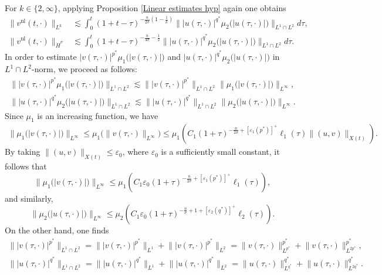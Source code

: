 \documentclass[11pt,reqno]{amsart}
\newcommand{\tron}[1]{\left( #1 \right)}
\numberwithin{equation}{section}
\begin{document}
For $k\in\{2,\infty\}$, applying Proposition \ref{Linear estimates hyp} again one obtains
\begin{align}
\big\|v^{\mathrm{nl}}(t,\cdot)\big\|_{L^k} &\lesssim \int_0^t(1+t-\tau)^{-\frac{n}{2\sigma}\tron{1-\frac{1}{k}}}\big\||u(\tau, \cdot)|^{q^*} \mu_2\big(|u(\tau, \cdot)|\big)\big\|_{L^1\cap L^2} d \tau,\label{eq4thr1.1}\\ 
\big\|v^{\mathrm{nl}}(t,\cdot)\big\|_{\dot{H}^{\sigma}} &\lesssim \int_0^t(1+t-\tau)^{-\frac{n}{4\sigma}-\frac{1}{2}}\big\||u(\tau, \cdot)|^{q^*} \mu_2\big(|u(\tau, \cdot)|\big)\big\|_{L^1\cap L^2} d \tau.\label{eq5thr1.1}
\end{align}
In order to estimate $|v(\tau, \cdot)|^{p^*} \mu_1\big(|v(\tau, \cdot)|\big)$ and $|u(\tau, \cdot)|^{q^*} \mu_2\big(|u(\tau, \cdot)|\big)$ in $L^1 \cap L^2$-norm, we proceed as follows:
\begin{align*}
\big\||v(\tau, \cdot)|^{p^*} \mu_1\big(|v(\tau, \cdot)|\big)\big\|_{L^1\cap L^2} \lesssim \big\||v(\tau, \cdot)|^{p^*}\big\|_{L^1\cap L^2}\big\|\mu_1\big(|v(\tau, \cdot)|\big)\big\|_{L^{\infty}},\\
\big\||u(\tau, \cdot)|^{q^*} \mu_2\big(|u(\tau, \cdot)|\big)\big\|_{L^1\cap L^2} \lesssim\big\||u(\tau, \cdot)|^{q^*}\big\|_{L^1\cap L^2}\big\|\mu_2\big(|u(\tau, \cdot)|\big)\big\|_{L^{\infty}}.
\end{align*}
Since $\mu_1$ is an increasing function, we have
$$
\begin{aligned}
\big\|\mu_1\big(|v(\tau, \cdot)|\big)\big\|_{L^{\infty}} \leq \mu_1\big(\|v(\tau, \cdot)\|_{L^{\infty}}\big) \leq \mu_1\left(C_1(1+\tau)^{-\frac{n}{2\sigma}+[\varepsilon_1(p^*)]^{+}}\ell_1(\tau)\|(u,v)\|_{X(t)}\right).
\end{aligned}
$$
By taking $\|(u,v)\|_{X(t)} \leq \varepsilon_0$, where $\varepsilon_0$ is a sufficiently small constant, it follows that
$$
\big\|\mu_1\big(|v(\tau, \cdot)|\big)\big\|_{L^{\infty}} \leq \mu_1\left(C_1 \varepsilon_0(1+\tau)^{-\frac{n}{2\sigma}+[\varepsilon_1(p^*)]^{+}}\ell_1(\tau)\right),
$$
and similarly,
\[
\big\|\mu_2\big(|u(\tau, \cdot)|\big)\big\|_{L^{\infty}} \leq\mu_2\left(C_1 \varepsilon_0(1+\tau)^{-\frac{n}{\sigma}+1+[\varepsilon_2(q^*)]^{+}}\ell_2(\tau)\right).
\]
On the other hand, one finds
$$
\begin{aligned}
\big\||v(\tau, \cdot)|^{p^*}\big\|_{L^1 \cap L^2}=\big\||v(\tau, \cdot)|^{p^*}\big\|_{L^1}+\big\||v(\tau, \cdot)|^{p^*}\big\|_{L^2}=\big\|v(\tau, \cdot)\big\|_{L^{p^*}}^{p^*}+\big\|v(\tau, \cdot)\big\|_{L^{2 p^*}}^{p^*},\\
\big\||u(\tau, \cdot)|^{q^*}\big\|_{L^1 \cap L^2}=\big\||u(\tau, \cdot)|^{q^*}\big\|_{L^1}+\big\||u(\tau, \cdot)|^{q^*}\big\|_{L^2}=\big\|u(\tau, \cdot)\big\|_{L^{q^*}}^{q^*}+\big\|u(\tau, \cdot)\big\|_{L^{2 q^*}}^{q^*}.
\end{aligned}
$$
\end{document}

